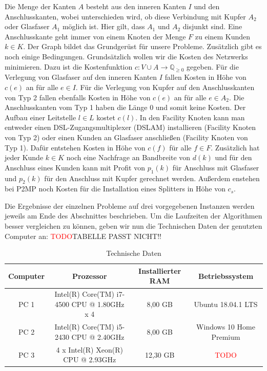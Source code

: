 \documentclass[11pt,a4paper]{article}
\newcommand{\Q}{\mathbb{Q}}
\newcommand{\TODO}{\textcolor{red}{TODO}}
\theoremstyle{my_th_style1}
\begin{document}
Die Menge der Kanten $A$ besteht aus den inneren Kanten $I$ und den Anschlusskanten, wobei unterschieden wird, ob diese Verbindung mit Kupfer $A_2$ oder Glasfaser $A_1$ möglich ist. Hier gilt, dass $A_1$ und $A_2$ disjunkt sind. 
Eine Anschlusskante geht immer von einem Knoten der Menge $F$ zu einem Kunden $k \in K$.
Der Graph bildet das Grundgerüst für unsere Probleme. Zusätzlich gibt es noch einige Bedingungen. Grundsätzlich wollen wir die Kosten des Netzwerks minimieren. 
Dazu ist die Kostenfunktion $c: V \cup A \rightarrow \Q_{\geq 0}$ gegeben.
Für die Verlegung von Glasfaser auf den inneren Kanten $I$ fallen Kosten in Höhe von $c(e)$ an für alle $e \in I$. 
Für die Verlegung von Kupfer auf den Anschlusskanten von Typ 2 fallen ebenfalls Kosten in Höhe von $c(e)$ an für alle $e \in A_2$. 
Die  Anschlusskanten vom Typ 1 haben die Länge 0 und somit keine Kosten.
Der Aufbau einer Leitstelle $ l\in L$ kostet $c(l)$. 
In den Facility Knoten kann man entweder einen DSL-Zugangsmultiplexer (DSLAM) installieren (Facility Knoten von Typ 2) oder einen Kunden an Glasfaser anschließen (Facility Knoten von Typ 1). Dafür entstehen Kosten in Höhe von $c(f)$ für alle $f \in F$.
Zusätzlich hat jeder Kunde \(k \in K\) noch eine Nachfrage an Bandbreite von $d(k)$ und für den Anschluss eines Kunden kann mit Profit von $p_1(k)$ für Anschluss mit Glasfaser und $p_2(k)$ für den Anschluss mit Kupfer gerechnet werden. Außerdem enstehen bei P2MP noch Kosten für die Installation eines Splitters in H\"ohe von $c_s$.

Die Ergebnisse der einzelnen Probleme auf drei vorgegebenen Instanzen werden jeweils am Ende des Abschnittes beschrieben.
Um die Laufzeiten der Algorithmen besser vergleichen zu können, geben wir nun die Technischen Daten der genutzten Computer an: \TODO TABELLE PASST NICHT!!
\begin{table}[h]
	\centering
	\begin{tabular}{|c|c|c|c|}
		\hline
		Computer & Prozessor & Installierter RAM & Betriebssystem \\	
		\hline
		PC 1 &Intel(R) Core(TM) i7-4500 CPU @ 1.80GHz x 4 & 8,00 GB & Ubuntu 18.04.1 LTS\\
		PC 2 & Intel(R) Core(TM) i5-2430 CPU @ 2.40GHz & 8,00 GB & Windows 10 Home Premium\\
		PC 3 & 4 x Intel(R) Xeon(R) CPU @ 2.93GHz  & 12,30 GB & \TODO\\
		\hline 
	\end{tabular}
	\caption{Technische Daten} 
\end{table}
\end{document}

